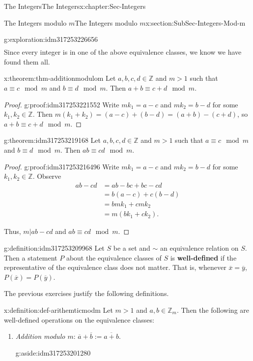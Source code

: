 \documentclass[oneside,10pt,]{book}
\newcommand{\terminology}[1]{\textbf{#1}}
\numberwithin{equation}{section}
\def\Z{{\mathbb Z}}
\newcommand{\amp}{&}
\begin{document}
\begin{chapterptx}{The Integers}{}{The Integers}{}{}{x:chapter:Sec-Integers}
\begin{sectionptx}{The Integers modulo \(m\)}{}{The Integers modulo \(m\)}{}{}{x:section:SubSec-Integers-Mod-m}
\begin{exploration}{}{g:exploration:idm317253226656}
\begin{align*}
\end{align*}
Since every integer is in one of the above equivalence classes, we know we have found them all.%
\end{exploration}
\begin{theorem}{}{}{x:theorem:thm-additionmodulom}%
Let \(a,b, c,d\in \Z\) and \(m > 1\) such that \(a\equiv c\mod m\) and \(b\equiv d\mod m\). Then \(a+b \equiv c + d \mod m\).%
\end{theorem}
\begin{proof}{}{g:proof:idm317253221552}
Write \(mk_1 = a-c\) and \(m k_2 = b-d\) for some \(k_1,k_2\in \Z\). Then \(m(k_1 + k_2) = (a-c) + (b-d) = (a+b) - (c+d)\), so \(a+b \equiv c+d\mod m\).%
\end{proof}
\begin{theorem}{}{}{g:theorem:idm317253219168}%
Let \(a,b, c,d\in \Z\) and \(m > 1\) such that \(a\equiv c\mod m\) and \(b\equiv d\mod m\). Then \(ab \equiv c d\mod m\).%
\end{theorem}
\begin{proof}{}{g:proof:idm317253216496}
Write \(mk_1 = a-c\) and \(m k_2 = b-d\) for some \(k_1,k_2\in \Z\). Observe%
\begin{align*}
ab -cd \amp = ab - bc + bc - cd\\
\amp = b(a-c) + c(b-d)\\
\amp = bmk_1 + cmk_2\\
\amp = m(bk_1 + ck_2)\text{.}
\end{align*}
%
\par
Thus, \(m|ab-cd\) and \(ab \equiv cd\mod m\).%
\end{proof}
\begin{definition}{}{g:definition:idm317253209968}%
%
Let \(S\) be a set and \(\sim\) an equivalence relation on \(S\). Then a statement \(P\) about the equivalence classes of \(S\) is \terminology{well-defined} if the representative of the equivalence class does not matter. That is, whenever \(\overline{x} = \overline{y}\), \(P(\overline{x}) = P(\overline{y})\).%
\end{definition}
The previous exercises justify the following definitions.%
\begin{definition}{}{x:definition:def-arithemticmodm}%
Let \(m > 1\) and \(a,b\in \Z_m\). Then the following are well-defined operations on the equivalence classes:%
\begin{enumerate}
\item{}\emph{Addition modulo \(m\)}: \(\overline{a} + \overline{b} := \overline{a+b}\). \begin{aside}{}{g:aside:idm317253201280}%

\end{aside}
\end{enumerate}
\end{definition}
\end{sectionptx}
\end{chapterptx}
\end{document}
